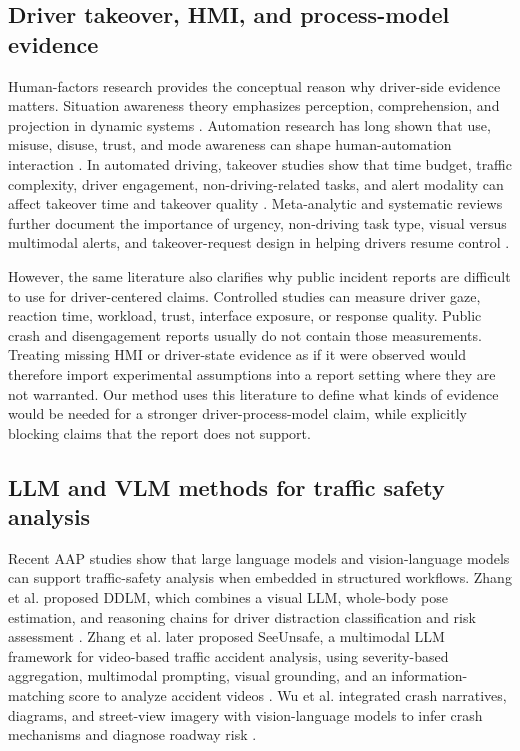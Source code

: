 \subsection{Driver takeover, HMI, and process-model evidence}

Human-factors research provides the conceptual reason why driver-side evidence matters. Situation awareness theory emphasizes perception, comprehension, and projection in dynamic systems \citep{endsley1995situation}. Automation research has long shown that use, misuse, disuse, trust, and mode awareness can shape human-automation interaction \citep{parasuraman1997humans,lee2004trust,sarter1995mode}. In automated driving, takeover studies show that time budget, traffic complexity, driver engagement, non-driving-related tasks, and alert modality can affect takeover time and takeover quality \citep{gold2013takeover,eriksson2017takeover,zeeb2015takeover}. Meta-analytic and systematic reviews further document the importance of urgency, non-driving task type, visual versus multimodal alerts, and takeover-request design in helping drivers resume control \citep{zhang2019takeovermeta,salubre2021tor}.

However, the same literature also clarifies why public incident reports are difficult to use for driver-centered claims. Controlled studies can measure driver gaze, reaction time, workload, trust, interface exposure, or response quality. Public crash and disengagement reports usually do not contain those measurements. Treating missing HMI or driver-state evidence as if it were observed would therefore import experimental assumptions into a report setting where they are not warranted. Our method uses this literature to define what kinds of evidence would be needed for a stronger driver-process-model claim, while explicitly blocking claims that the report does not support.

\subsection{LLM and VLM methods for traffic safety analysis}

Recent AAP studies show that large language models and vision-language models can support traffic-safety analysis when embedded in structured workflows. Zhang et al. proposed DDLM, which combines a visual LLM, whole-body pose estimation, and reasoning chains for driver distraction classification and risk assessment \citep{zhang2024ddlm}. Zhang et al. later proposed SeeUnsafe, a multimodal LLM framework for video-based traffic accident analysis, using severity-based aggregation, multimodal prompting, visual grounding, and an information-matching score to analyze accident videos \citep{zhang2025seeunsafe}. Wu et al. integrated crash narratives, diagrams, and street-view imagery with vision-language models to infer crash mechanisms and diagnose roadway risk \citep{wu2026saferroads}.

